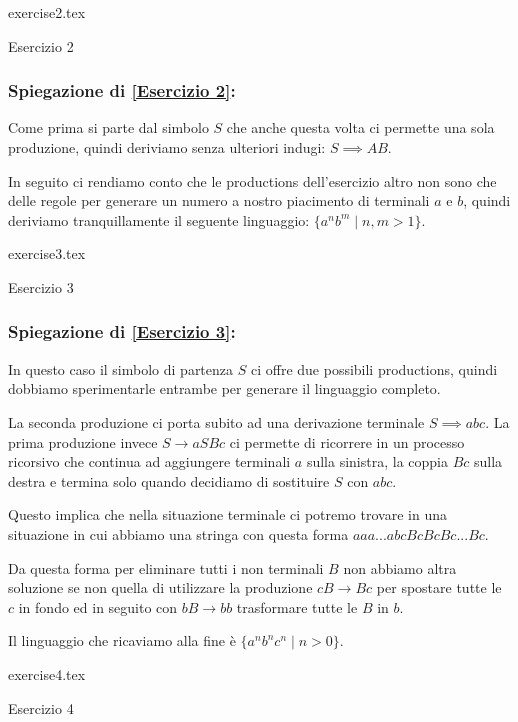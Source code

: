 \documentclass[class=book, crop=false, oneside, 12pt]{standalone}
\begin{document}
\begin{table}[H]
	\centering
	{exercise2.tex}
    \caption{Esercizio 2}
    \label{Esercizio 2}
\end{table}
\subsubsection*{Spiegazione di \ref{Esercizio 2}:}
Come prima si parte dal simbolo $S$ che anche questa volta ci permette una sola produzione, quindi deriviamo senza ulteriori indugi: $S \implies AB$.

In seguito ci rendiamo conto che le productions dell'esercizio altro non sono che delle regole per generare un numero a nostro piacimento di terminali $a$ e $b$, quindi deriviamo tranquillamente il seguente linguaggio: $\{a^n b^m \mid n,m>1\}$.

\begin{table}[H]
	\centering
	{exercise3.tex}
    \caption{Esercizio 3}
    \label{Esercizio 3}
\end{table}
\subsubsection*{Spiegazione di \ref{Esercizio 3}:}
In questo caso il simbolo di partenza $S$ ci offre due possibili productions, quindi dobbiamo sperimentarle entrambe per generare il linguaggio completo.

La seconda produzione ci porta subito ad una derivazione terminale $S \implies abc$.
La prima produzione invece $S \to aSBc$ ci permette di ricorrere in un processo ricorsivo che continua ad aggiungere terminali $a$ sulla sinistra, la coppia $Bc$ sulla destra e termina solo quando decidiamo di sostituire $S$ con $abc$.

Questo implica che nella situazione terminale ci potremo trovare in una situazione in cui abbiamo una stringa con questa forma $aaa...abcBcBcBc...Bc$.

Da questa forma per eliminare tutti i non terminali $B$ non abbiamo altra soluzione se non quella di utilizzare la produzione $cB \to Bc$ per spostare tutte le $c$ in fondo ed in seguito con $bB \to bb$ trasformare tutte le $B$ in $b$.

Il linguaggio che ricaviamo alla fine è $\{a^nb^nc^n \mid n>0\}$.

\begin{table}[H]
	\centering
	{exercise4.tex}
    \caption{Esercizio 4}
    \label{Esercizio 4}
\end{table}
\end{document}
